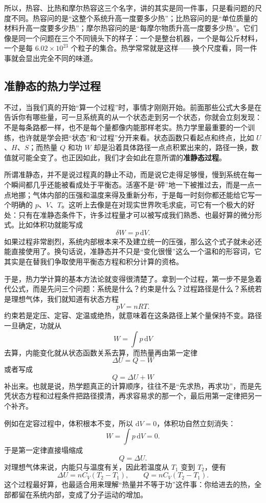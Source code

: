 \documentclass[UTF8]{ctexbook}
\begin{document}
所以，热容、比热和摩尔热容这三个名字，讲的其实是同一件事，只是看问题的尺度不同。热容问的是“这整个系统升高一度要多少热”；比热容问的是“单位质量的材料升高一度要多少热”；摩尔热容问的是“每摩尔物质升高一度要多少热”。它们像是同一个问题在三个不同镜头下的样子：一个是整台机器，一个是每公斤材料，一个是每 \(6.02\times10^{23}\) 个粒子的集合。热学常常就是这样——换个尺度看，同一件事就会显出完全不同的味道。

\subsection{准静态的热力学过程}

不过，当我们真的开始“算一个过程”时，事情才刚刚开始。前面那些公式大多是在告诉你有哪些量，可一旦系统真的从一个状态走到另一个状态，你就会立刻发现：不是每条路都一样，也不是每个量都像内能那样老实。热力学里最重要的一个训练，也许就是学会把“状态”和“过程”分开来看。状态函数只看起点和终点，比如 \(U\)、\(H\)、\(S\)；而热量 \(Q\) 和功 \(W\) 却是沿着具体路径一点点积累出来的，路径一换，数值就可能全变了。也正因如此，我们才会如此在意所谓的\textbf{准静态过程}。

所谓准静态，并不是说过程真的静止不动，而是说它走得足够慢，慢到系统在每一个瞬间都几乎还能被看成处于平衡态。活塞不是“砰”地一下被推过去，而是一点一点地挪；气体内部的压强和温度来得及重新分布，于是每一时刻你都还能给它写一个明确的 \(p\)、\(V\)、\(T\)。这听上去像是在对现实世界吹毛求疵，可它有一个极大的好处：只有在准静态条件下，许多过程量才可以被写成我们熟悉、也最好算的微分形式。比如体积功就能写成
\[
\delta W=p\,\mathrm dV.
\]
如果过程非常剧烈，系统内部根本来不及建立统一的压强，那么这个式子就未必还能直接使用了。换句话说，准静态并不只是“变化很慢”这么一个温和的形容词，它其实是在替我们争取使用平衡态方程和积分计算的资格。

于是，热力学计算的基本方法论就变得很清楚了。拿到一个过程，第一步不是急着代公式，而是先问三个问题：系统是什么？约束是什么？过程路径是什么？系统若是理想气体，我们就知道有状态方程
\[
pV=nRT.
\]
约束若是定压、定容、定温或绝热，就意味着在这条路径上某个量保持不变。路径一旦确定，功就从
\[
W=\int p\,\mathrm dV
\]
去算，内能变化就从状态函数关系去算，而热量再由第一定律
\[
\Delta U=Q-W
\]
或者写成
\[
Q=\Delta U+W
\]
补出来。也就是说，热学题真正的计算顺序，往往不是“先求热，再求功”，而是先凭状态方程和过程条件把路径摸清，再求容易求的那一个，最后用第一定律把另一个补齐。

例如在定容过程中，体积根本不变，所以 \(\mathrm dV=0\)，体积功自然立刻消失：
\[
W=\int p\,\mathrm dV=0.
\]
于是第一定律直接塌缩成
\[
Q=\Delta U.
\]
对理想气体来说，内能只与温度有关，因此若温度从 \(T_1\) 变到 \(T_2\)，便有
\[
\Delta U=nC_V(T_2-T_1),
\qquad
Q=nC_V(T_2-T_1).
\]
这个过程最好算，也最适合用来理解“热量并不等于功”这件事：你给进去的热，全部都留在系统内部，变成了分子运动的增加。
\end{document}
